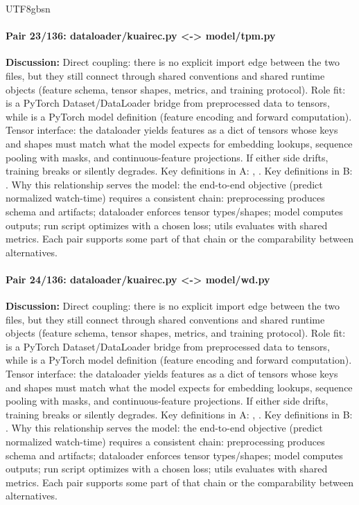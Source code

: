 \documentclass[11pt]{article}
\begin{document}
\begin{CJK*}{UTF8}{gbsn}
\paragraph{Pair 23/136: dataloader/kuairec.py <-> model/tpm.py}
\textbf{Discussion:} Direct coupling: there is no explicit import edge between the two files, but they still connect through shared conventions and shared runtime objects (feature schema, tensor shapes, metrics, and training protocol). Role fit: \texttt{} is a PyTorch Dataset/DataLoader bridge from preprocessed data to tensors, while \texttt{} is a PyTorch model definition (feature encoding and forward computation). Tensor interface: the dataloader yields features as a dict of tensors whose keys and shapes must match what the model expects for embedding lookups, sequence pooling with masks, and continuous-feature projections. If either side drifts, training breaks or silently degrades. Key definitions in A: \texttt{}, \texttt{}. Key definitions in B: \texttt{}. Why this relationship serves the model: the end-to-end objective (predict normalized watch-time) requires a consistent chain: preprocessing produces schema and artifacts; dataloader enforces tensor types/shapes; model computes outputs; run script optimizes with a chosen loss; utils evaluates with shared metrics. Each pair supports some part of that chain or the comparability between alternatives.

\paragraph{Pair 24/136: dataloader/kuairec.py <-> model/wd.py}
\textbf{Discussion:} Direct coupling: there is no explicit import edge between the two files, but they still connect through shared conventions and shared runtime objects (feature schema, tensor shapes, metrics, and training protocol). Role fit: \texttt{} is a PyTorch Dataset/DataLoader bridge from preprocessed data to tensors, while \texttt{} is a PyTorch model definition (feature encoding and forward computation). Tensor interface: the dataloader yields features as a dict of tensors whose keys and shapes must match what the model expects for embedding lookups, sequence pooling with masks, and continuous-feature projections. If either side drifts, training breaks or silently degrades. Key definitions in A: \texttt{}, \texttt{}. Key definitions in B: \texttt{}. Why this relationship serves the model: the end-to-end objective (predict normalized watch-time) requires a consistent chain: preprocessing produces schema and artifacts; dataloader enforces tensor types/shapes; model computes outputs; run script optimizes with a chosen loss; utils evaluates with shared metrics. Each pair supports some part of that chain or the comparability between alternatives.


\end{CJK*}
\end{document}
